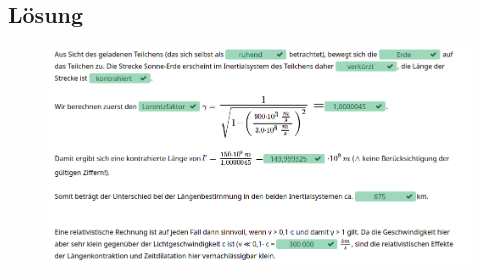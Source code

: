 \documentclass[a4paper]{report}
\begin{document}
\subsection{Lösung}
\begin{figure}[h]
	\centering
	\includegraphics[scale=.5]{images/Lösung_Längenkontraktion.png}
	\end{figure}
\end{document}
